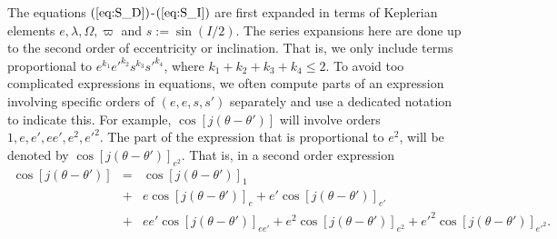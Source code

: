 \documentclass [12pt, a4paper] {article}
\begin{document}
The equations $(\ref{eq:S_D})$-$(\ref{eq:S_I})$ are first expanded in terms of Keplerian 
elements $e, \lambda, \Omega, \varpi$ and $s:= \sin(I/2)$.
The series expansions here are done up to the second order of eccentricity or inclination.
That is, we only include terms proportional to $e^{k_1}e'^{k_2}s^{k_3}s'^{k_4}$, where 
$k_1 + k_2 + k_3 + k_4 \leq 2$. To avoid too complicated expressions in equations, we often 
compute parts of an expression involving specific orders of $(e, e, s, s')$ separately and 
use a dedicated notation to indicate this. For example, $\cos [j(\theta - \theta')]$ will involve 
orders $1, e, e', ee', e^2, e'^2$. The part of the expression that is proportional 
to $e^2$, will be denoted by $\cos [j(\theta - \theta')]_{e^2}$. That is, in a second 
order expression
\begin {eqnarray}
    \cos [j(\theta - \theta')] 
    &=& 
    \cos [j(\theta - \theta')]_{1}
    \\\nonumber
    &+&
    e\cos [j(\theta - \theta')]_{e}
    +
    e'\cos [j(\theta - \theta')]_{e'}
    \\\nonumber
    &+&
    ee'\cos [j(\theta - \theta')]_{ee'}
    +
    e^2\cos [j(\theta - \theta')]_{e^2}
    +
    e'^2\cos [j(\theta - \theta')]_{e'^2}.
\end {eqnarray}
\end{document}
